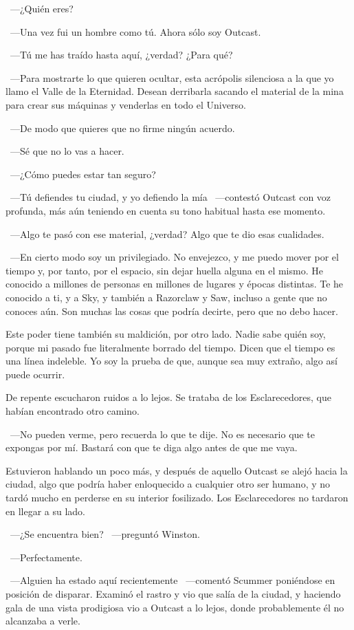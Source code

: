 ~---¿Quién eres?

~---Una vez fui un hombre como tú. Ahora sólo soy Outcast.

~---Tú me has traído hasta aquí, ¿verdad? ¿Para qué?

~---Para mostrarte lo que quieren ocultar, esta acrópolis silenciosa a la que yo llamo el Valle de la Eternidad. Desean derribarla sacando el material de la mina para crear sus máquinas y venderlas en todo el Universo.

~---De modo que quieres que no firme ningún acuerdo.

~---Sé que no lo vas a hacer.

~---¿Cómo puedes estar tan seguro?

~---Tú defiendes tu ciudad, y yo defiendo la mía ~---contestó Outcast con voz profunda, más aún teniendo en cuenta su tono habitual hasta ese momento.

~---Algo te pasó con ese material, ¿verdad? Algo que te dio esas cualidades.

~---En cierto modo soy un privilegiado. No envejezco, y me puedo mover por el tiempo y, por tanto, por el espacio, sin dejar huella alguna en el mismo. He conocido a millones de personas en millones de lugares y épocas distintas. Te he conocido a ti, y a Sky, y también a Razorclaw y Saw, incluso a gente que no conoces aún. Son muchas las cosas que podría decirte, pero que no debo hacer.

\rquoti{}Este poder tiene también su maldición, por otro lado. Nadie sabe quién soy, porque mi pasado fue literalmente borrado del tiempo. Dicen que el tiempo es una línea indeleble. Yo soy la prueba de que, aunque sea muy extraño, algo así puede ocurrir.

De repente escucharon ruidos a lo lejos. Se trataba de los Esclarecedores, que habían encontrado otro camino.

~---No pueden verme, pero recuerda lo que te dije. No es necesario que te expongas por mí. Bastará con que te diga algo antes de que me vaya.

Estuvieron hablando un poco más, y después de aquello Outcast se alejó hacia la ciudad, algo que podría haber enloquecido a cualquier otro ser humano, y no tardó mucho en perderse en su interior fosilizado. Los Esclarecedores no tardaron en llegar a su lado.

~---¿Se encuentra bien? ~---preguntó Winston.

~---Perfectamente.

~---Alguien ha estado aquí recientemente ~---comentó Scummer poniéndose en posición de disparar. Examinó el rastro y vio que salía de la ciudad, y haciendo gala de una vista prodigiosa vio a Outcast a lo lejos, donde probablemente él no alcanzaba a verle.

